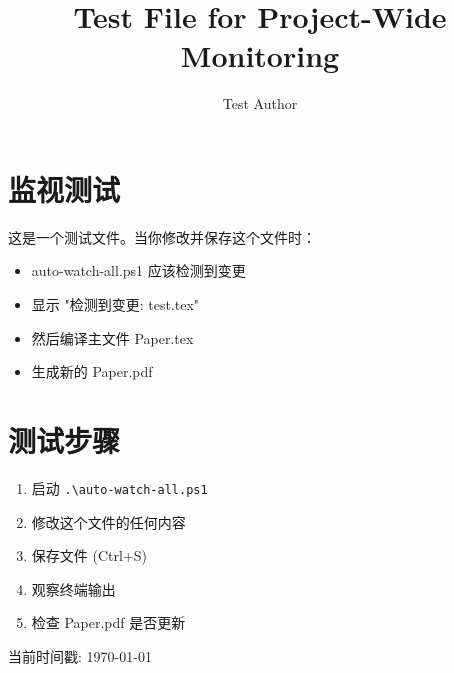 \documentclass{article}
\title{Test File for Project-Wide Monitoring}
\author{Test Author}
\begin{document}
\maketitle

\section{监视测试}

这是一个测试文件。当你修改并保存这个文件时：

\begin{itemize}
\item auto-watch-all.ps1 应该检测到变更
\item 显示 "检测到变更: test.tex"
\item 然后编译主文件 Paper.tex
\item 生成新的 Paper.pdf
\end{itemize}

\section{测试步骤}

\begin{enumerate}
\item 启动 \texttt{.\textbackslash auto-watch-all.ps1}
\item 修改这个文件的任何内容
\item 保存文件 (Ctrl+S)
\item 观察终端输出
\item 检查 Paper.pdf 是否更新
\end{enumerate}

当前时间戳: \today
\end{document}
